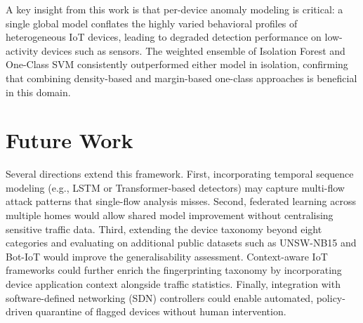 \documentclass[conference]{IEEEtran}
\begin{document}
A key insight from this work is that per-device anomaly modeling is critical:
a single global model conflates the highly varied behavioral profiles of
heterogeneous IoT devices, leading to degraded detection performance on
low-activity devices such as sensors. The weighted ensemble of Isolation
Forest and One-Class SVM consistently outperformed either model in isolation,
confirming that combining density-based and margin-based one-class approaches
is beneficial in this domain.

\section{Future Work}
\label{sec:future}

Several directions extend this framework. First, incorporating temporal
sequence modeling (e.g., LSTM or Transformer-based detectors)
\cite{mcdermott2018botnet,goodfellow2016deep} may capture multi-flow
attack patterns that single-flow analysis misses. Second, federated
learning \cite{chandola2009anomaly} across multiple homes would allow
shared model improvement without centralising sensitive traffic data.
Third, extending the device taxonomy beyond eight categories and evaluating
on additional public datasets such as UNSW-NB15 \cite{moustafa2015unswnb15}
and Bot-IoT \cite{koroniotis2019bot} would improve the generalisability
assessment. Context-aware IoT frameworks \cite{perera2014context} could
further enrich the fingerprinting taxonomy by incorporating device
application context alongside traffic statistics. Finally, integration with
software-defined networking (SDN) controllers \cite{hamza2019detecting}
could enable automated, policy-driven quarantine of flagged devices without
human intervention.

\balance


\end{document}
